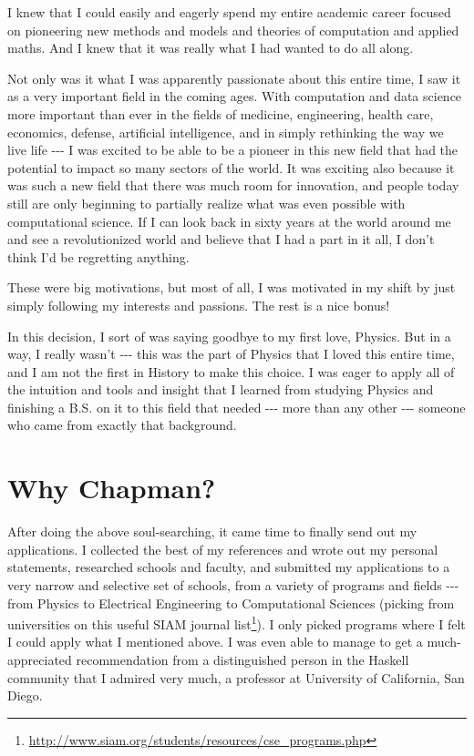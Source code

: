 \documentclass[]{article}
\renewcommand{\href}[2]{#2\footnote{\url{#1}}}
\begin{document}
I knew that I could easily and eagerly spend my entire academic career focused
on pioneering new methods and models and theories of computation and applied
maths. And I knew that it was really what I had wanted to do all along.

Not only was it what I was apparently passionate about this entire time, I saw
it as a very important field in the coming ages. With computation and data
science more important than ever in the fields of medicine, engineering, health
care, economics, defense, artificial intelligence, and in simply rethinking the
way we live life -\/-\/- I was excited to be able to be a pioneer in this new
field that had the potential to impact so many sectors of the world. It was
exciting also because it was such a new field that there was much room for
innovation, and people today still are only beginning to partially realize what
was even possible with computational science. If I can look back in sixty years
at the world around me and see a revolutionized world and believe that I had a
part in it all, I don't think I'd be regretting anything.

These were big motivations, but most of all, I was motivated in my shift by just
simply following my interests and passions. The rest is a nice bonus!

In this decision, I sort of was saying goodbye to my first love, Physics. But in
a way, I really wasn't -\/-\/- this was the part of Physics that I loved this
entire time, and I am not the first in History to make this choice. I was eager
to apply all of the intuition and tools and insight that I learned from studying
Physics and finishing a B.S. on it to this field that needed -\/-\/- more than
any other -\/-\/- someone who came from exactly that background.

\section{Why Chapman?}

After doing the above soul-searching, it came time to finally send out my
applications. I collected the best of my references and wrote out my personal
statements, researched schools and faculty, and submitted my applications to a
very narrow and selective set of schools, from a variety of programs and fields
-\/-\/- from Physics to Electrical Engineering to Computational Sciences
(picking from universities on this
\href{http://www.siam.org/students/resources/cse_programs.php}{useful SIAM
journal list}). I only picked programs where I felt I could apply what I
mentioned above. I was even able to manage to get a much-appreciated
recommendation from a distinguished person in the Haskell community that I
admired very much, a professor at University of California, San Diego.
\end{document}

